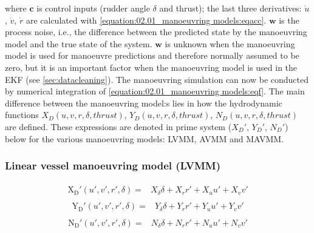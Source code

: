 where \(\mathbf{c}\) is control inputs (rudder angle \(\delta\) and thrust); the last three derivatives: \(\dot{u}\), \(\dot{v}\), \(\dot{r}\) are calculated with \autoref{equation:02.01_manoeuvring models:eqacc}.
\(\mathbf{w}\) is the process noise, i.e., the difference between the predicted state by the manoeuvring model and the true
state of the system. \(\mathbf{w}\) is unknown when the manoeuvring model is used for manoeuvre predictions and therefore normally
assumed to be zero, but it is an important factor when the manoeuvring model is used in the EKF (see \autoref{sec:datacleaning}).
The manoeuvring simulation can now be conducted by numerical integration of \autoref{equation:02.01_manoeuvring models:eqf}. The main difference between the manoeuvring model:s lies in how the hydrodynamic functions \(X_D(u,v,r,\delta,thrust)\), \(Y_D(u,v,r,\delta,thrust)\), \(N_D(u,v,r,\delta,thrust)\) are defined. These expressions are denoted in prime system ($X_D'$, $Y_D'$, $N_D'$) below for the various manoeuvring models: LVMM, AVMM and MAVMM.

\subsubsection*{{\normalfont \textbf{Linear vessel manoeuvring model (LVMM) \cite{matusiak_dynamics_2021}}}}
\begin{equation}\label{equation:02.01_manoeuvring models:eqxlinear}
\begin{split}\begin{split}
\operatorname{X_{D}'}{\left(u',v',r',\delta\right)} = & X_{\delta} \delta + X_{r} r' + X_{u} u' + X_{v} v' 
\end{split}\end{split}
\end{equation}\begin{equation}\label{equation:02.01_manoeuvring models:eqylinear}
\begin{split}\begin{split}
\operatorname{Y_{D}'}{\left(u',v',r',\delta \right)} = & Y_{\delta} \delta + Y_{r} r' + Y_{u} u' + Y_{v} v' 
\end{split}\end{split}
\end{equation}\begin{equation}\label{equation:02.01_manoeuvring models:eqnlinear}
\begin{split}\begin{split}
\operatorname{N_{D}'}{\left(u',v',r',\delta \right)} = & N_{\delta} \delta + N_{r} r' + N_{u} u' + N_{v} v' 
\end{split}\end{split}
\end{equation}


